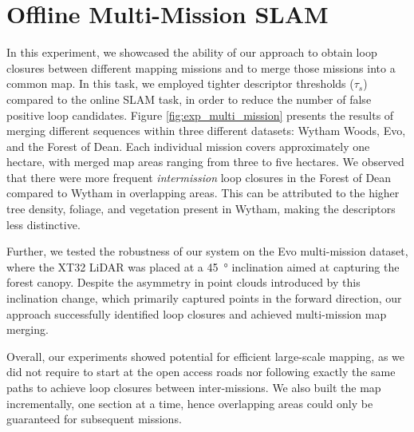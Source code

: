\section{Offline Multi-Mission SLAM} 
\label{sec:offline_multi_mission}
In this experiment, we showcased the ability of our approach to obtain loop closures between different mapping missions and to merge those missions into a common map. In this task, we employed tighter descriptor thresholds ($\tau_{s}$) compared to the online SLAM task, in order to reduce the number of false positive loop candidates.
Figure \ref{fig:exp_multi_mission} presents the results of merging different sequences within three different datasets: Wytham Woods, Evo, and the Forest of Dean. Each individual mission covers approximately one hectare, with merged map areas ranging from three to five hectares.
We observed that there were more frequent \emph{intermission} loop closures in the Forest of Dean compared to Wytham in overlapping areas. This can be attributed to the higher tree density, foliage, and vegetation present in Wytham, making the descriptors less distinctive.     

Further, we tested the robustness of our system on the Evo multi-mission dataset, where the XT32 LiDAR was placed at a \SI{45}{\degree} inclination aimed at capturing the forest canopy. Despite the asymmetry in point clouds introduced by this inclination change, which primarily captured points in the forward direction, our approach successfully identified loop closures and achieved multi-mission map merging.

Overall, our experiments showed potential for efficient large-scale mapping, as we did not require to start at the open access roads nor following exactly the same paths to achieve loop closures between inter-missions. We also built the map incrementally, one section at a time, hence overlapping areas could only be guaranteed for subsequent missions.


